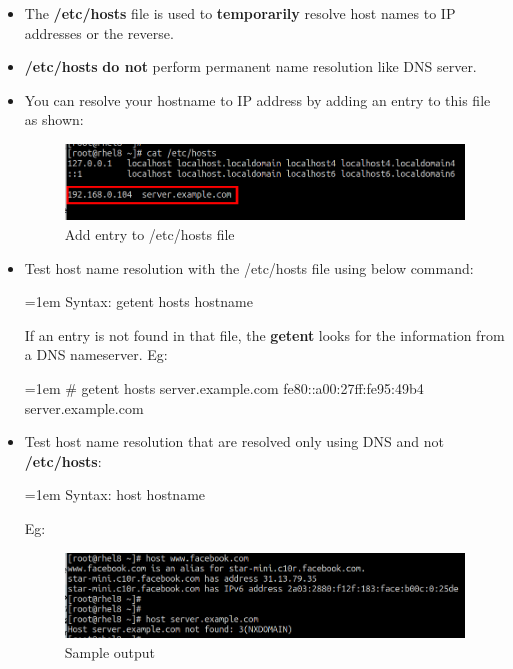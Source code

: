 \setlength{\columnsep}{3pt}
\begin{flushleft}
\bigskip

\begin{itemize}
	\item The \textbf{/etc/hosts} file is used to \textbf{temporarily} resolve host names to IP addresses or the reverse. 
	\item \textbf{/etc/hosts} \textbf{do not} perform permanent name resolution like DNS server.
	\item You can resolve your hostname to IP address by adding an entry to this file as shown:
	\begin{figure}[h!]
		\centering
		\includegraphics[scale=.35]{content/chapter14/images/hosts3.png}
		\caption{Add entry to /etc/hosts file}
		\label{fig:hosts3}
	\end{figure}		
	
	\item Test host name resolution with the /etc/hosts file using below command:
	\bigskip
		\begin{tcolorbox}[breakable,notitle,boxrule=-0pt,colback=pink,colframe=pink]
		\color{black}
		\font=1em
		Syntax: getent hosts hostname
		\font=4pt
	\end{tcolorbox}
	If an entry is not found in that file, the \textbf{getent} looks for the information from a DNS
	nameserver.
	\newline
	Eg:
	\bigskip
	\begin{tcolorbox}[breakable,notitle,boxrule=-0pt,colback=black,colframe=black]
		\color{green}
		\font=1em
		\# getent hosts server.example.com
		\newline
		\color{white}
		fe80::a00:27ff:fe95:49b4 server.example.com
		\font=4pt
	\end{tcolorbox}
	\newpage
	\item Test host name resolution that are resolved only using DNS and not \textbf{/etc/hosts}:
	\bigskip
	\begin{tcolorbox}[breakable,notitle,boxrule=-0pt,colback=pink,colframe=pink]
		\color{black}
		\font=1em
		Syntax: host hostname
		\font=4pt
	\end{tcolorbox}
	Eg:
	\bigskip
	\begin{figure}[h!]
		\centering
		\includegraphics[scale=.35]{content/chapter14/images/hosts2.png}
		\caption{Sample output}
		\label{fig:hosts2}
	\end{figure}		


\end{itemize}
\end{flushleft}
